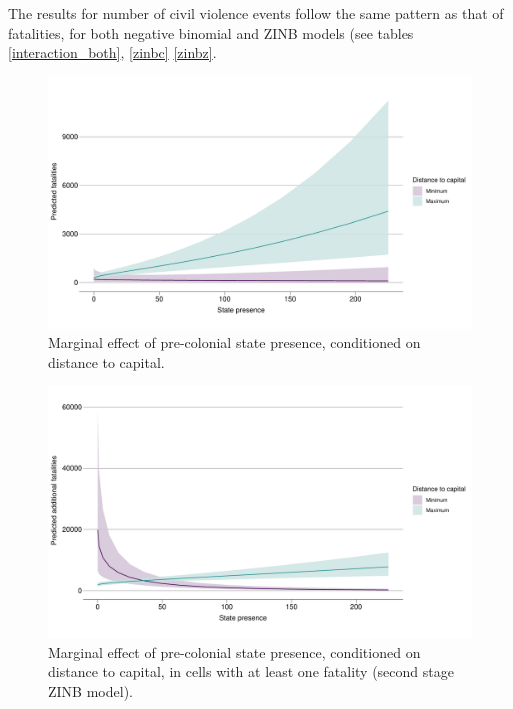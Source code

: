 The results for number of civil violence events follow the same pattern as that
of fatalities, for both negative binomial and ZINB models (see tables
\ref{interaction_both}, \ref{zinbc} \ref{zinbz}.


\begin{figure}[htpb] \centering
	\includegraphics[width=\linewidth]{"../R/Output/deathsInterPlot.pdf"}
	\caption{Marginal effect of pre-colonial state presence, conditioned on
	distance to capital.}
	\label{interdeaths}
\end{figure}

\begin{figure}[htpb]
	\centering
	\includegraphics[width=\linewidth]{"../R/Output/interdeathszinbplot.pdf"}
	\caption{Marginal effect of pre-colonial state presence, conditioned on
	distance to capital, in cells with at least one fatality (second stage
ZINB model).}
	\label{deaths_zinb}
\end{figure}

